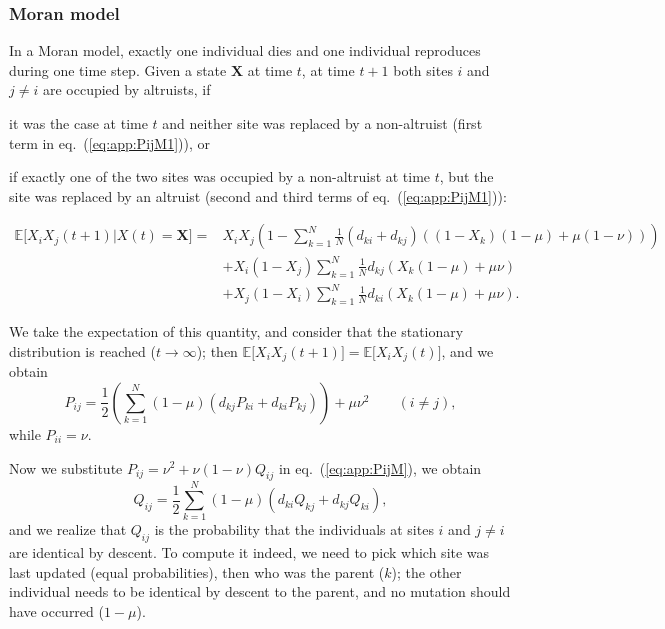 \documentclass[11pt, letterpaper]{article}
\renewcommand{\eqref}[1]{\textup{{\normalfont eq.~(\ref{#1}}\normalfont)}}
\newcommand{\Esp}[1]{\mathbb{E}\big[ #1\big]}%
\newcommand{\mutbias}{\nu}
\begin{document}
\subsubsection{Moran model}
In a Moran model, exactly one individual dies and one individual reproduces during one time step. Given a state $\mathbf{X}$ at time $t$, at time $t+1$ both sites $i$ and $j\neq i$ are occupied by altruists, if \begin{inparaenum}[\it i\rm)]\item it was the case at time $t$ and neither site was replaced by a non-altruist (first term in \eqref{eq:app:PijM1}), or \item if exactly one of the two sites was occupied by a non-altruist at time $t$, but the site was replaced by an altruist (second and third terms of \eqref{eq:app:PijM1}): \end{inparaenum}
%
\begin{align}\label{eq:app:PijM1}
 \Esp{X_iX_j(t+1)|X(t)=\mathbf{X}} = & X_i X_j \left(1 - \sum_{k=1}^N \frac{1}{N} \left( d_{ki} + d_{kj} \right) \left( (1-X_k) (1-\mu) + \mu (1-\mutbias)\right) \right) \nonumber \\
  &+ X_i (1-X_j) \sum_{k=1}^N \frac{1}{N} d_{kj} \left( X_k (1-\mu) + \mu \mutbias \right)  \\
& + X_j (1-X_i) \sum_{k=1}^N \frac{1}{N} d_{ki} \left( X_k (1-\mu) + \mu \mutbias \right). \nonumber
\end{align}

We take the expectation of this quantity, and consider that the stationary distribution is reached ($t\to \infty$); then $\Esp{X_iX_j(t+1)} = \Esp{X_i X_j (t)}$, and we obtain
%
\begin{equation}\label{eq:app:PijM}
P_{ij} = \frac{1}{2} \left(\sum_{k=1}^N (1-\mu) \left( d_{kj} P_{ki} + d_{ki} P_{kj}\right) \right) + \mu \mutbias^2 \qquad (i\neq j ),
\end{equation} 
while $P_{ii}=\mutbias$. 

Now we substitute $P_{ij} = \mutbias^2 + \mutbias (1-\mutbias) Q_{ij}$ in \eqref{eq:app:PijM}, we obtain
\begin{equation}\label{eq:app:QijM}
Q_{ij} = \frac{1}{2} \sum_{k=1}^N (1-\mu) \left( d_{ki} Q_{kj} + d_{kj} Q_{ki}\right),
\end{equation}
and we realize that $Q_{ij}$ is the probability that the individuals at sites $i$ and $j \neq i$ are identical by descent. To compute it indeed, we need to pick which site was last updated (equal probabilities), then who was the parent ($k$); the other individual needs to be identical by descent to the parent, and no mutation should have occurred ($1-\mu$). 
\end{document}

